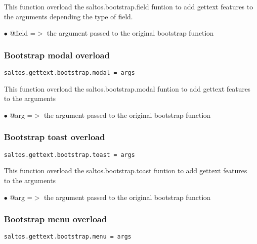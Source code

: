\documentclass[a4paper]{article}
\begin{document}
This function overload the saltos.bootstrap.field funtion to add gettext
features to the arguments depending the type of field.

\begin{compactitem}
\item[\color{myblue}$\bullet$] @field =$>$ the argument passed to the original bootstrap function
\end{compactitem}

\hypertarget{toc803}{}
\subsubsection{Bootstrap modal overload}

\begin{lstlisting}
saltos.gettext.bootstrap.modal = args
\end{lstlisting}

This function overload the saltos.bootstrap.modal funtion to add gettext
features to the arguments

\begin{compactitem}
\item[\color{myblue}$\bullet$] @arg =$>$ the argument passed to the original bootstrap function
\end{compactitem}

\hypertarget{toc804}{}
\subsubsection{Bootstrap toast overload}

\begin{lstlisting}
saltos.gettext.bootstrap.toast = args
\end{lstlisting}

This function overload the saltos.bootstrap.toast funtion to add gettext
features to the arguments

\begin{compactitem}
\item[\color{myblue}$\bullet$] @arg =$>$ the argument passed to the original bootstrap function
\end{compactitem}

\hypertarget{toc805}{}
\subsubsection{Bootstrap menu overload}

\begin{lstlisting}
saltos.gettext.bootstrap.menu = args
\end{lstlisting}
\end{document}
